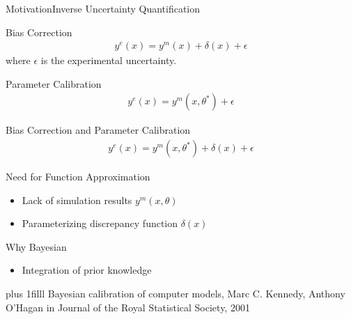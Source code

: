 \begin{frame}{Motivation}{Inverse Uncertainty Quantification}
	\begin{block}{Bias Correction}
		\begin{align}
			y^e(x) = y^m(x)+\delta(x)+\epsilon \nonumber
		\end{align}
		where $\epsilon$ is the experimental uncertainty.
	\end{block}
	\pause
	\begin{block}{Parameter Calibration}
		\begin{align}
			y^e(x) = y^m(x,\theta^*)+\epsilon \nonumber
		\end{align}
	\end{block}
	\pause
	\begin{block}{Bias Correction and Parameter Calibration}
		\begin{align}
			y^e(x) = y^m(x,\theta^*)+\delta(x)+\epsilon \nonumber
		\end{align}
	\end{block}

\end{frame}

\begin{frame}{Need for Function Approximation}
	\begin{itemize}
		\item Lack of simulation results $y^m(x,\theta)$
		\item Parameterizing discrepancy function $\delta(x)$
	\end{itemize}

	\begin{block}{Why Bayesian}
		\begin{itemize}
			\item Integration of prior knowledge

		\end{itemize}
	\end{block}
	\vskip0pt plus 1filll
Bayesian calibration of computer models, Marc C. Kennedy, Anthony O'Hagan in Journal of the Royal Statistical Society, 2001 

\end{frame}
